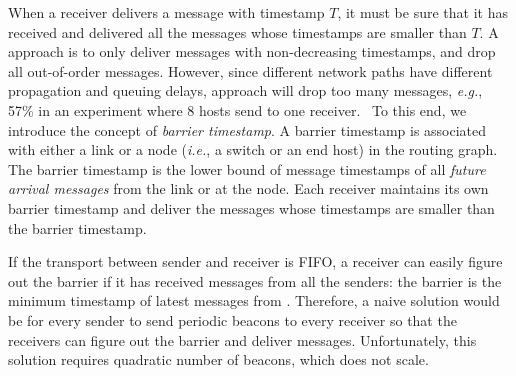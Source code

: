 When a receiver delivers a message with timestamp $T$, it must be sure that it has received and delivered all the messages whose timestamps are smaller than $T$.
A  approach is to only deliver messages with non-decreasing timestamps, and drop all out-of-order messages.
However, since different network paths have different propagation and queuing delays,  approach will drop too many messages, \textit{e.g.}, 57\% in an experiment where 8 hosts send to one receiver.~
To this end, we introduce the concept of \emph{barrier timestamp}.
A barrier timestamp is associated with either a link or a node (\textit{i.e.}, a switch or an end host) in the routing graph.
The barrier timestamp is the lower bound of message timestamps of all \emph{future arrival messages} from the link or at the node.
Each receiver maintains its own barrier timestamp and deliver the messages whose timestamps are smaller than the barrier timestamp.

If the transport between sender and receiver is FIFO, a receiver can easily figure out the barrier if it has received messages from all the senders: the barrier is the minimum timestamp of latest messages from . Therefore, a naive solution would be for every sender to send periodic beacons to every receiver so that the receivers can figure out the barrier and deliver messages. Unfortunately, this solution requires quadratic number of beacons, which does not scale.




